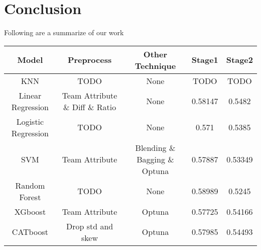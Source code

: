 \section{Conclusion}
Following are a summarize of our work 
\begin{table}[h]
    \centering
    \begin{tabular}{|c|c|c|c|c|}
    \hline
    Model & Preprocess & Other Technique & Stage1 & Stage2 \\ \hline\hline
    KNN   & TODO   & None & TODO & TODO  \\ \hline
    Linear Regression & Team Attribute \& Diff \& Ratio & None & 0.58147 & 0.5482 \\ \hline
    Logistic Regression & TODO & None & 0.571 & 0.5385 \\ \hline
    SVM & Team Attribute & Blending \& Bagging \& Optuna & 0.57887 & 0.53349 \\ \hline
    Random Forest & TODO & None & 0.58989 & 0.5245 \\ \hline
    XGboost & Team Attribute & Optuna & 0.57725 & 0.54166 \\ \hline
    CATboost & Drop std and skew & Optuna & 0.57985 & 0.54493 \\ \hline
    \end{tabular}
    \label{tab:example_table}
\end{table}

